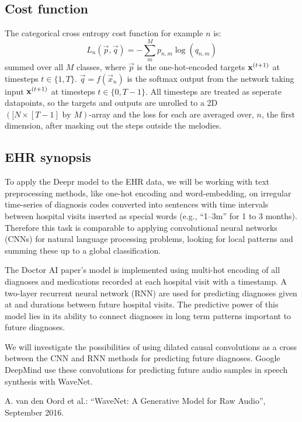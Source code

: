 	\subsection{Cost function} 
	The categorical cross entropy cost function for example $n$ is:
	\begin{equation}
		L_n(\vec{p}, \vec{q}) = -\sum^{M}_{m} p_{n,m} \log (q_{n,m})
	\end{equation}
	summed over all $M$ classes, where $\vec{p}$ is the one-hot-encoded targets $\bm{\mathrm{x}}^{(t+1)}$ at timesteps $t\in\{1, T\}$. $\vec{q}=f(\vec{x}_n)$ is the softmax output from the network taking input $\bm{\mathrm{x}}^{(t+1)}$ at timesteps $t\in\{0, T-1\}$. All timesteps are treated as seperate datapoints, so the targets and outputs are unrolled to a 2D $([N \times [T-1] \text{ by } M)$-array and the loss for each are averaged over, $n$, the first dimension, after masking out the steps outside the melodies.



\subsection*{EHR synopsis}

To apply the Deepr model to the EHR data, we will be working with text preprocessing methods, like one-hot encoding and word-embedding, on irregular time-series of diagnosis codes converted into sentences with time intervals between hospital visits inserted as special words (e.g., “1--3m” for 1 to 3 months). Therefore this task is comparable to applying convolutional neural networks (CNNs) for natural language processing problems, looking for local patterns and summing these up to a global classification.

The Doctor AI paper’s model is implemented using multi-hot encoding of all diagnoses and medications recorded at each hospital visit with a timestamp. A two-layer recurrent neural network (RNN) are used for predicting diagnoses given at and durations between future hospital visits. The predictive power of this model lies in its ability to connect diagnoses in long term patterns important to future diagnoses.

We will investigate the possibilities of using dilated causal convolutions as a cross between the CNN and RNN methods for predicting future diagnoses. Google DeepMind use these convolutions for predicting future audio samples in speech synthesis with WaveNet.

A. van den Oord et al.: “WaveNet: A Generative Model for Raw Audio”, September 2016.
